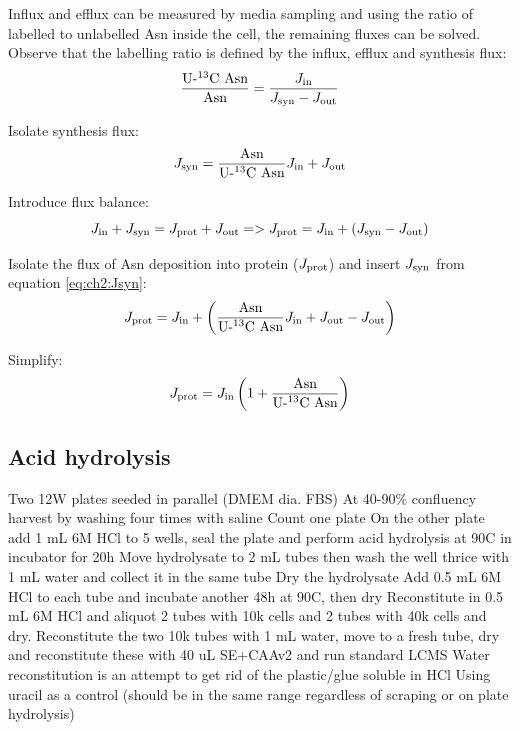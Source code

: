 Influx and efflux can be measured by media sampling and using the ratio of labelled to unlabelled Asn inside the cell, the remaining fluxes can be solved.
Observe that the labelling ratio is defined by the influx, efflux and synthesis flux:
\begin{equation}
    \frac{\text{U-\textsuperscript{13}C Asn}}{\text{Asn}} = \frac{J_{\text{in}}}{J_{\text{syn}} - J_{\text{out}}}
\end{equation}

Isolate synthesis flux:
\begin{equation}
    J_{\text{syn}} = \frac{\text{Asn}}{\text{U-\textsuperscript{13}C Asn}} J_{\text{in}} + J_{\text{out}}
\label{eq:ch2:Jsyn}
\end{equation}

Introduce flux balance:
\begin{equation}
    J_{\text{in}} + J_{\text{syn}} = J_{\text{prot}} + J_{\text{out}} => J_{\text{prot}} = J_{\text{in}} + (J_{\text{syn}} - J_{\text{out}})
\end{equation}

Isolate the flux of Asn deposition into protein ($J_{\text{prot}}$) and insert $J_{\text{syn}}$ from equation \ref{eq:ch2:Jsyn}:
\begin{equation}
    J_{\text{prot}} = J_{\text{in}} + \left( \frac{\text{Asn}}{\text{U-\textsuperscript{13}C Asn}} J_{\text{in}} + J_{\text{out}} - J_{\text{out}} \right)
\end{equation}

Simplify:
\begin{equation}
    J_{\text{prot}} = J_{\text{in}} \left( 1 + \frac{\text{Asn}}{\text{U-\textsuperscript{13}C Asn}} \right)
\label{eq:ch2:Jprot}
\end{equation}






\subsection{Acid hydrolysis}





Two 12W plates seeded in parallel (DMEM dia. FBS)
At 40-90\% confluency harvest by washing four times with saline
Count one plate
On the other plate add 1 mL 6M HCl to 5 wells, seal the plate and perform acid hydrolysis at 90C in incubator for 20h
Move hydrolysate to 2 mL tubes then wash the well thrice with 1 mL water and collect it in the same tube
Dry the hydrolysate
Add 0.5 mL 6M HCl to each tube and incubate another 48h at 90C, then dry
Reconstitute in 0.5 mL 6M HCl and aliquot 2 tubes with 10k cells and 2 tubes with 40k cells and dry.
Reconstitute the two 10k tubes with 1 mL water, move to a fresh tube, dry and reconstitute these with 40 uL SE+CAAv2 and run standard LCMS
Water reconstitution is an attempt to get rid of the plastic/glue soluble in HCl
Using uracil as a control (should be in the same range regardless of scraping or on plate hydrolysis)






